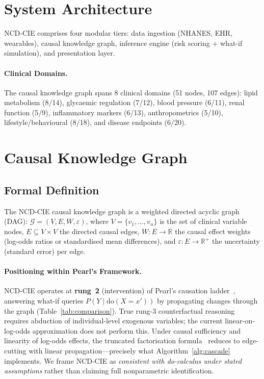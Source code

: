 \documentclass[runningheads]{llncs}
\begin{document}
\section{System Architecture}\label{sec:arch}

NCD-CIE comprises four modular tiers: data ingestion (NHANES, EHR,
wearables), causal knowledge graph, inference engine (risk scoring +
what-if simulation), and presentation layer.

\paragraph{Clinical Domains.}
The causal knowledge graph spans 8 clinical domains (51 nodes,
107 edges): lipid metabolism (8/14), glycaemic regulation (7/12),
blood pressure (6/11), renal function (5/9), inflammatory markers
(6/13), anthropometrics (5/10), lifestyle/behavioural (8/18), and
disease endpoints (6/20).

\section{Causal Knowledge Graph}\label{sec:kg}

\subsection{Formal Definition}\label{sec:formal}

The NCD-CIE causal knowledge graph is a weighted directed
acyclic graph (DAG):
$\mathcal{G} = (V, E, W, \varepsilon)$,
where $V=\{v_1,\ldots,v_n\}$ is the set of clinical variable nodes,
$E \subseteq V \times V$ the directed causal edges,
$W: E \rightarrow \mathbb{R}$ the causal effect weights
(log-odds ratios or standardised mean differences), and
$\varepsilon: E \rightarrow \mathbb{R}^+$ the uncertainty
(standard error) per edge.

\paragraph{Positioning within Pearl's Framework.}
NCD-CIE operates at \textbf{rung~2} (intervention) of Pearl's
causation ladder~\cite{pearl2018book}, answering what-if queries
$P(Y \mid \mathrm{do}(X = x'))$ by propagating changes through the
graph (Table~\ref{tab:comparison}).
True rung-3 counterfactual reasoning requires abduction of
individual-level exogenous variables; the current linear-on-log-odds
approximation does not perform this.
Under causal sufficiency and linearity of log-odds effects, the
truncated factorisation formula~\cite{pearl2009causality} reduces to
edge-cutting with linear propagation---precisely what
Algorithm~\ref{alg:cascade} implements.
We frame NCD-CIE as \emph{consistent with do-calculus under stated
assumptions} rather than claiming full nonparametric identification.
\end{document}
